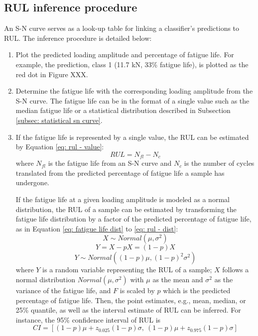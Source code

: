 \subsection{RUL inference procedure}
An S-N curve serves as a look-up table for linking a classifier's predictions to RUL. The inference procedure is detailed below:
\begin{enumerate}
    \item Plot the predicted loading amplitude and percentage of fatigue life. For example, the prediction, class 1 (11.7 kN, 33\% fatigue life), is plotted as the red dot in Figure XXX.
    \item Determine the fatigue life with the corresponding loading amplitude from the S-N curve. The fatigue life can be in the format of a single value such as the median fatigue life or a statistical distribution described in Subsection \ref{subsec: statistical sn curve}.
    \item If the fatigue life is represented by a single value, the RUL can be estimated by Equation \eqref{eq: rul - value}: 
    \begin{equation}
        \label{eq: rul - value}
        RUL = N_{fl} - N_{c}
    \end{equation}
    where $N_{fl}$ is the fatigue life from an S-N curve and $N_c$ is the number of cycles translated from the predicted percentage of fatigue life a sample has undergone.

    If the fatigue life at a given loading amplitude is modeled as a normal distribution, the RUL of a sample can be estimated by transforming the fatigue life distribution by a factor of the predicted percentage of fatigue life, as in Equation \eqref{eq: fatigue life dist} to \eqref{eq: rul - dist}:
    \begin{equation}
        \label{eq: fatigue life dist}
        X \sim Normal(\mu, \sigma^2)
    \end{equation}
    \begin{equation}
        \label{eq: rul transform}
        Y = X - pX = (1 - p)X
    \end{equation}
    \begin{equation}
        \label{eq: rul - dist}
        Y \sim Normal((1-p)\mu, (1-p)^2\sigma^2)
    \end{equation}
    where $Y$ is a random variable representing the RUL of a sample; $X$ follows a normal distribution $Normal (\mu, \sigma^2)$ with $\mu$ as the mean and $\sigma^2$ as the variance of the fatigue life, and $F$ is scaled by $p$ which is the predicted percentage of fatigue life. Then, the point estimates, e.g., mean, median, or 25\% quantile, as well as the interval estimate of RUL can be inferred. For instance, the 95\% confidence interval of RUL is
    \begin{equation}
        CI = [(1-p)\mu + z_{0.025} (1-p) \sigma,\ (1-p)\mu + z_{0.975} (1-p) \sigma]
    \end{equation}
\end{enumerate}

